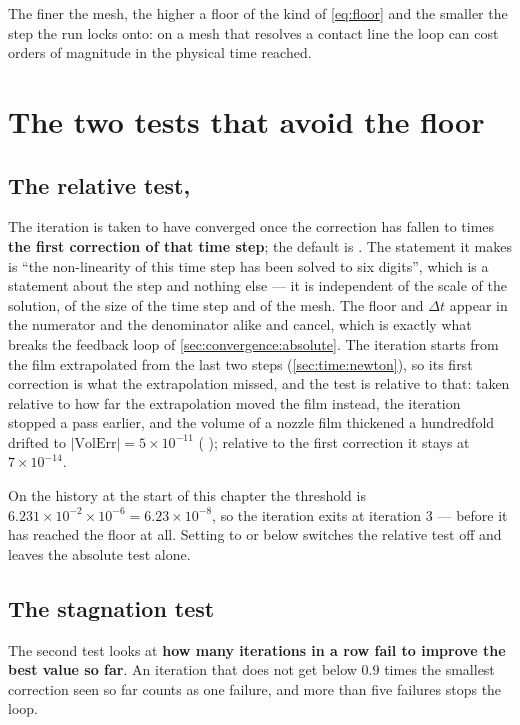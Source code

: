 The finer the mesh, the higher a floor of the kind of \cref{eq:floor} and the
smaller the step the run locks onto: on a mesh that resolves a contact line
the loop can cost orders of magnitude in the physical time reached.

\section{The two tests that avoid the floor}
\label{sec:convergence:tests}

\subsection{The relative test, }

The iteration is taken to have converged once the correction has fallen to
 times \textbf{the first correction of that time step};
the default is . The statement it makes is ``the non-linearity of this
time step has been solved to six digits'', which is a statement about the step
and nothing else --- it is independent of the scale of the solution, of the
size of the time step and of the mesh. The floor and $\Delta t$ appear in the
numerator and the denominator alike and cancel, which is exactly what breaks
the feedback loop of \cref{sec:convergence:absolute}. The iteration starts
from the film extrapolated from the last two steps (\cref{sec:time:newton}),
so its first correction is what the extrapolation missed, and the test is
relative to that: taken relative to how far the extrapolation moved the film
instead, the iteration stopped a pass earlier, and the volume of a nozzle film
thickened a hundredfold drifted to $|\mathrm{VolErr}| = 5\times10^{-11}$
( ); relative to the first
correction it stays at $7\times10^{-14}$.

On the history at the start of this chapter the threshold is
$6.231\times10^{-2} \times 10^{-6} = 6.23\times10^{-8}$, so the iteration exits
at iteration 3 --- before it has reached the floor at all. Setting
 to  or below switches the relative test off and
leaves the absolute test alone.

\subsection{The stagnation test}
\label{sec:convergence:stagnation}

The second test looks at \textbf{how many iterations in a row fail to improve
the best value so far}. An iteration that does not get below $0.9$ times the
smallest correction seen so far counts as one failure, and more than five
failures stops the loop.

